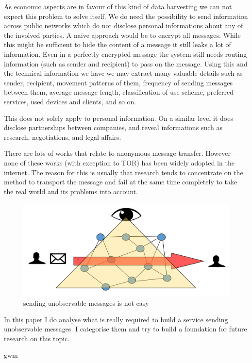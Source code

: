 \documentclass[12pt,journal,compsoc,peerreview]{IEEEtran}
\begin{document}
As economic aspects are in favour of this kind of data harvesting we can not expect this problem to solve itself. We do need the possibility to send information across public networks which do not disclose personal informations about any of the involved parties. A naive approach would be to encrypt all messages. While this might be sufficient to hide the content of a message it still leaks a lot of information. Even in a perfectly encrypted message the system still needs routing information (such as sender and recipient) to pass on the message. Using this and the technical information we have we may extract many valuable details such as sender, recipient, movement patterns of them, frequency of sending messages between them, average message length, classification of use scheme, preferred services, used devices and clients, and so on.\par
This does not solely apply to personal information. On a similar level it does disclose partnerships between companies, and reveal informations such as research, negotiations, and legal affairs.
\par
There are lots of works\cite{tor-design}\cite{mixmaster-spec}\cite{xor-trees}\cite{Levine:2002}\cite{chaum-mix} that relate to
anonymous message transfer. However -- none of these works (with exception to TOR\cite{tor-design}) has been widely adopted in the internet. The reason for this is usually that research tends to concentrate on the method to transport the message and fail at the same time completely to take the real world and its problems into account. 

\begin{figure}
	\includegraphics[width=0.9\linewidth]{../poster/messagetransfer.png}
	\caption{sending unobservable messages is not easy}
\end{figure}

In this paper I do analyse what is really required to build a service sending unobservable messages. I categorise them and try to build a foundation for future research on this topic.
\par
\ifCLASSOPTIONpeerreview
\else
\hfill gwm
 
\end{document}
